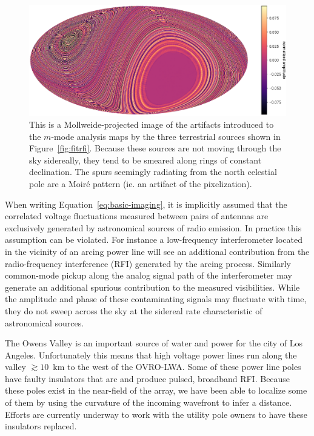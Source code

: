 \documentclass[twocolumn]{aastex61}
\begin{document}
\begin{figure}[t]
    \centering
    \includegraphics[height=0.32\textheight]{figures/terrestrial-interference/rings}
    \caption{
        This is a Mollweide-projected image of the artifacts introduced to the $m$-mode analysis
        maps by the three terrestrial sources shown in Figure~\ref{fig:fitrfi}. Because these
        sources are not moving through the sky sidereally, they tend to be smeared along rings of
        constant declination. The spurs seemingly radiating from the north celestial pole are a
        Moir\'{e} pattern (ie. an artifact of the pixelization).
    }
    \label{fig:rings}
\end{figure}

When writing Equation~\ref{eq:basic-imaging}, it is implicitly assumed that the correlated voltage
fluctuations measured between pairs of antennas are exclusively generated by astronomical sources of
radio emission. In practice this assumption can be violated. For instance a low-frequency
interferometer located in the vicinity of an arcing power line will see an additional contribution
from the radio-frequency interference (RFI) generated by the arcing process. Similarly common-mode
pickup along the analog signal path of the interferometer may generate an additional spurious
contribution to the measured visibilities. While the amplitude and phase of these contaminating
signals may fluctuate with time, they do not sweep across the sky at the sidereal rate
characteristic of astronomical sources.

The Owens Valley is an important source of water and power for the city of Los Angeles.
Unfortunately this means that high voltage power lines run along the valley $\gtrsim10$~km to the
west of the OVRO-LWA. Some of these power line poles have faulty insulators that arc and produce
pulsed, broadband RFI. Because these poles exist in the near-field of the array, we have been able
to localize some of them by using the curvature of the incoming wavefront to infer a distance.
Efforts are currently underway to work with the utility pole owners to have these insulators
replaced.
\end{document}
